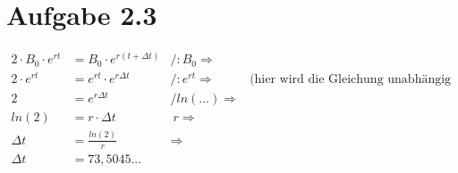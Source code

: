 \documentclass{scrreprt}
\begin{document}
\section*{Aufgabe 2.3}

\begin{align*}
2 \cdot B_0 \cdot e^{r t} &= B_0 \cdot e^{r(t+\Delta t)}&/ :B_0 \Rightarrow&\\
2 \cdot e^{r t} &= e^{r t} \cdot e^{r \Delta t} & / :e^{r t} \Rightarrow  & \text{(hier wird die Gleichung unabhängig gemacht)}\\
2 &= e^{r \Delta t}&/ ln(...)  \Rightarrow  &\\
ln(2) &= r \cdot \Delta t&\:r  \Rightarrow  &\\
\Delta t &= \frac{ln(2)}{r}& \Rightarrow  &\\
\Delta t &= 73,5045...&&
\end{align*}

\newpage
\end{document}
